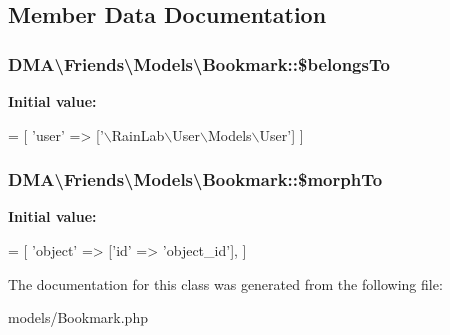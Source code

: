 \subsection{Member Data Documentation}
\hypertarget{classDMA_1_1Friends_1_1Models_1_1Bookmark_a0ea2d8ae2044eb34baeff4502d6feef6}{
\subsubsection[{\$belongs\+To}]{\setlength{\rightskip}{0pt plus 5cm}D\+M\+A\textbackslash{}\+Friends\textbackslash{}\+Models\textbackslash{}\+Bookmark\+::\$belongs\+To}}\label{classDMA_1_1Friends_1_1Models_1_1Bookmark_a0ea2d8ae2044eb34baeff4502d6feef6}
{\bfseries Initial value\+:}
\begin{DoxyCode}
= [
        \textcolor{stringliteral}{'user'} => [\textcolor{stringliteral}{'\(\backslash\)RainLab\(\backslash\)User\(\backslash\)Models\(\backslash\)User'}]
    ]
\end{DoxyCode}
\hypertarget{classDMA_1_1Friends_1_1Models_1_1Bookmark_ad516a6ea7fc7967a8cba2a86340963df}{
\subsubsection[{\$morph\+To}]{\setlength{\rightskip}{0pt plus 5cm}D\+M\+A\textbackslash{}\+Friends\textbackslash{}\+Models\textbackslash{}\+Bookmark\+::\$morph\+To}}\label{classDMA_1_1Friends_1_1Models_1_1Bookmark_ad516a6ea7fc7967a8cba2a86340963df}
{\bfseries Initial value\+:}
\begin{DoxyCode}
= [
        \textcolor{stringliteral}{'object'} => [\textcolor{stringliteral}{'id'} => \textcolor{stringliteral}{'object\_id'}],
    ]
\end{DoxyCode}


The documentation for this class was generated from the following file\+:\begin{DoxyCompactItemize}
\item 
models/Bookmark.\+php\end{DoxyCompactItemize}
